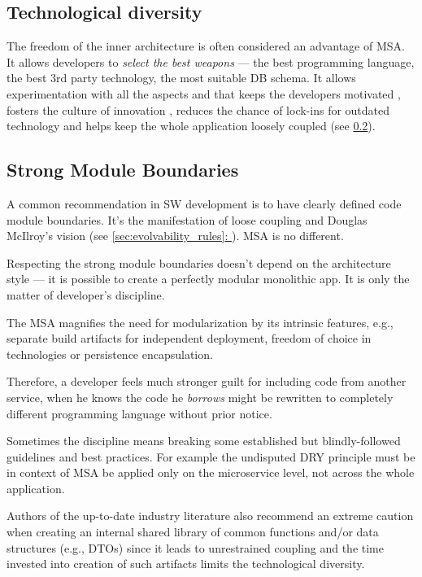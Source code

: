 \documentclass[thesis=M,english,hidelinks]{FITthesis}[2012/10/20]
\newcommand*{\fullref}[1]{\hyperref[{#1}]{\autoref*{#1}: \textit{\nameref*{#1}}}}
\begin{document}
\subsection{Technological diversity}
The freedom of the inner architecture is often considered an advantage of \acrshort{MSA}. It allows developers to \textit{select the best weapons} --- the best programming language, the best 3rd party technology, the most suitable \acrshort{DB} schema. It allows experimentation with all the aspects and that keeps the developers motivated \cite{ms-building-ms, ms-3-pillars}, fosters the culture of innovation \cite{innovation-well-oiled-machine}, reduces the chance of lock-ins for outdated technology \cite{ms-building-ms} and helps keep the whole application loosely coupled (see \ref{sec:strong_boundaries}).

\subsection{Strong Module Boundaries}
\label{sec:strong_boundaries}
A common recommendation in \acrshort{SW} development is to have clearly defined code module boundaries. It's the manifestation of loose coupling and Douglas McIlroy's vision (see \fullref{sec:evolvability_rules}). \acrshort{MSA} is no different.

Respecting the strong module boundaries doesn't depend on the architecture style --- it is possible to create a perfectly modular monolithic app. It is only the matter of developer's discipline.

The \acrlong{MSA} magnifies the need for modularization by its intrinsic features, e.g., separate build artifacts for independent deployment, freedom of choice in technologies or persistence encapsulation.

Therefore, a developer feels much stronger guilt for including code from another service, when he knows the code he \textit{borrows} might be rewritten to completely different programming language without prior notice.

Sometimes the discipline means breaking some established but blindly-followed guidelines and best practices. For example the undisputed \acrfull{DRY} principle must be in context of \acrshort{MSA} be applied only on the microservice level, not across the whole application. 

Authors of the up-to-date industry literature \cite{ms-building-ms, ms-evolutionary-arch, ms-ca} also recommend an extreme caution when creating an internal shared library of common functions and/or data structures (e.g., \acrshort{DTO}s) since it leads to unrestrained coupling and the time invested into creation of such artifacts limits the technological diversity. 
\end{document}
